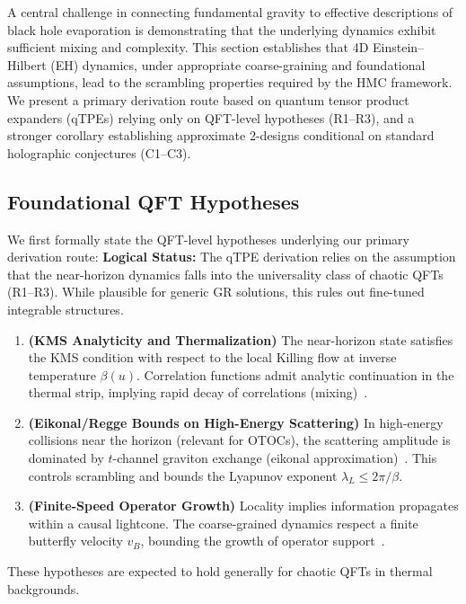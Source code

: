 \documentclass[11pt,a4paper]{article}
\theoremstyle{plain}
\theoremstyle{definition}
\theoremstyle{remark}
\begin{document}
A central challenge in connecting fundamental gravity to effective descriptions of black hole evaporation is demonstrating that the underlying dynamics exhibit sufficient mixing and complexity. This section establishes that 4D Einstein--Hilbert (EH) dynamics, under appropriate coarse-graining and foundational assumptions, lead to the scrambling properties required by the HMC framework. We present a primary derivation route based on quantum tensor product expanders (qTPEs) relying only on QFT-level hypotheses (R1--R3), and a stronger corollary establishing approximate 2-designs conditional on standard holographic conjectures (C1--C3).

\subsection{Foundational QFT Hypotheses}
We first formally state the QFT-level hypotheses underlying our primary derivation route:
\textbf{Logical Status:} The qTPE derivation relies on the assumption that the near-horizon dynamics falls into the universality class of chaotic QFTs (R1--R3). While plausible for generic GR solutions, this rules out fine-tuned integrable structures.

\begin{enumerate}[label=\textbf{R\arabic*}:,leftmargin=*]
  \item \textbf{(KMS Analyticity and Thermalization)} The near-horizon state satisfies the KMS condition with respect to the local Killing flow at inverse temperature $\beta(u)$. Correlation functions admit analytic continuation in the thermal strip, implying rapid decay of correlations (mixing)~\cite{Haag:1992}.
  \item \textbf{(Eikonal/Regge Bounds on High-Energy Scattering)} In high-energy collisions near the horizon (relevant for OTOCs), the scattering amplitude is dominated by $t$-channel graviton exchange (eikonal approximation)~\cite{tHooft:1987,AmatiCiafaloniVeneziano:1989}. This controls scrambling and bounds the Lyapunov exponent $\lambda_L \le 2\pi/\beta$.
  \item \textbf{(Finite-Speed Operator Growth)} Locality implies information propagates within a causal lightcone. The coarse-grained dynamics respect a finite butterfly velocity $v_B$, bounding the growth of operator support~\cite{ShenkerStanford:2014}.
\end{enumerate}
These hypotheses are expected to hold generally for chaotic QFTs in thermal backgrounds.
\end{document}
